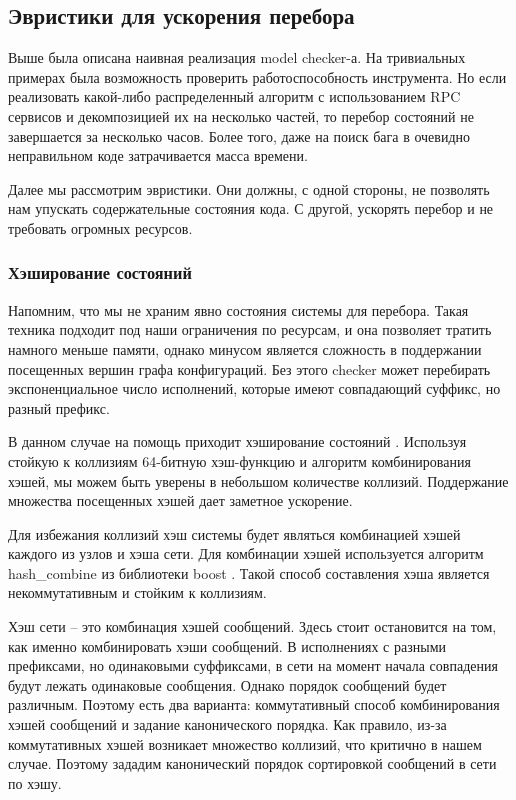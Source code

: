 \subsection{Эвристики для ускорения перебора}

Выше была описана наивная реализация model checker-а. На тривиальных примерах была возможность проверить работоспособность инструмента. Но если реализовать какой-либо распределенный алгоритм с использованием RPC сервисов и декомпозицией их на несколько частей, то перебор состояний не завершается за несколько часов. Более того, даже на поиск бага в очевидно неправильном коде затрачивается масса времени.

Далее мы рассмотрим эвристики. Они должны, с одной стороны, не позволять нам упускать содержательные состояния кода. С другой, ускорять перебор и не требовать огромных ресурсов.

\subsubsection{Хэширование состояний}

Напомним, что мы не храним явно состояния системы для перебора. Такая техника подходит под наши ограничения по ресурсам, и она позволяет тратить намного меньше памяти, однако минусом является сложность в поддержании посещенных вершин графа конфигураций. Без этого checker может перебирать экспоненциальное число исполнений, которые имеют совпадающий суффикс, но разный префикс.

В данном случае на помощь приходит хэширование состояний \cite{hash}. Используя стойкую к коллизиям 64-битную хэш-функцию и алгоритм комбинирования хэшей, мы можем быть уверены в небольшом количестве коллизий. Поддержание множества посещенных хэшей дает заметное ускорение.

Для избежания коллизий хэш системы будет являться комбинацией хэшей каждого из узлов и хэша сети. Для комбинации хэшей используется алгоритм hash\_combine из библиотеки boost \cite{boost}. Такой способ составления хэша является некоммутативным и стойким к коллизиям.

Хэш сети – это комбинация хэшей сообщений. Здесь стоит остановится на том, как именно комбинировать хэши сообщений. В исполнениях с разными префиксами, но одинаковыми суффиксами, в сети на момент начала совпадения будут лежать одинаковые сообщения. Однако порядок сообщений будет различным. Поэтому есть два варианта: коммутативный способ комбинирования хэшей сообщений и задание канонического порядка. Как правило, из-за коммутативных хэшей возникает множество коллизий, что критично в нашем случае. Поэтому зададим канонический порядок сортировкой сообщений в сети по хэшу. 

